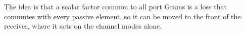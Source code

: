 
The idea is that a scalar factor common to all port Grams is a loss that
commutes with every passive element, so it can be moved to the front of the
receiver, where it acts on the channel modes alone.

